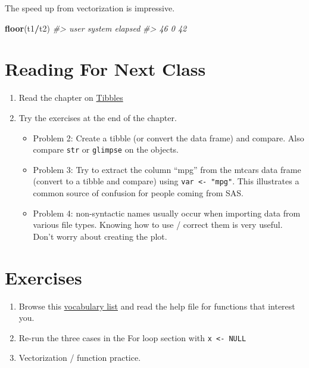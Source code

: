 \documentclass[]{book}
\newenvironment{Shaded}{\begin{snugshade}}{\end{snugshade}}
\newcommand{\KeywordTok}[1]{\textcolor[rgb]{0.13,0.29,0.53}{\textbf{#1}}}
\newcommand{\CommentTok}[1]{\textcolor[rgb]{0.56,0.35,0.01}{\textit{#1}}}
\newcommand{\OperatorTok}[1]{\textcolor[rgb]{0.81,0.36,0.00}{\textbf{#1}}}
\newcommand{\NormalTok}[1]{#1}
\providecommand{\tightlist}{%
  \setlength{\itemsep}{0pt}\setlength{\parskip}{0pt}}
\begin{document}
The speed up from vectorization is impressive.

\begin{Shaded}
\begin{Highlighting}[]
\KeywordTok{floor}\NormalTok{(t1}\OperatorTok{/}\NormalTok{t2)}
\CommentTok{#>    user  system elapsed }
\CommentTok{#>      46       0      42}
\end{Highlighting}
\end{Shaded}

\section{Reading For Next Class}\label{reading-for-next-class-1}

\begin{enumerate}
\def\labelenumi{\arabic{enumi}.}
\tightlist
\item
  Read the chapter on \href{http://r4ds.had.co.nz/tibbles.html}{Tibbles}
\item
  Try the exercises at the end of the chapter.

  \begin{itemize}
  \tightlist
  \item
    Problem 2: Create a tibble (or convert the data frame) and compare.
    Also compare \texttt{str} or \texttt{glimpse} on the objects.
  \item
    Problem 3: Try to extract the column ``mpg'' from the mtcars data
    frame (convert to a tibble and compare) using
    \texttt{var\ \textless{}-\ "mpg"}. This illustrates a common source
    of confusion for people coming from SAS.
  \item
    Problem 4: non-syntactic names usually occur when importing data
    from various file types. Knowing how to use / correct them is very
    useful. Don't worry about creating the plot.
  \end{itemize}
\end{enumerate}

\section{Exercises}\label{exercises-1}

\begin{enumerate}
\def\labelenumi{\arabic{enumi}.}
\tightlist
\item
  Browse this \href{http://adv-r.had.co.nz/Vocabulary.html}{vocabulary
  list} and read the help file for functions that interest you.
\item
  Re-run the three cases in the For loop section with
  \texttt{x\ \textless{}-\ NULL}
\item
  Vectorization / function practice.
\end{enumerate}
\end{document}
